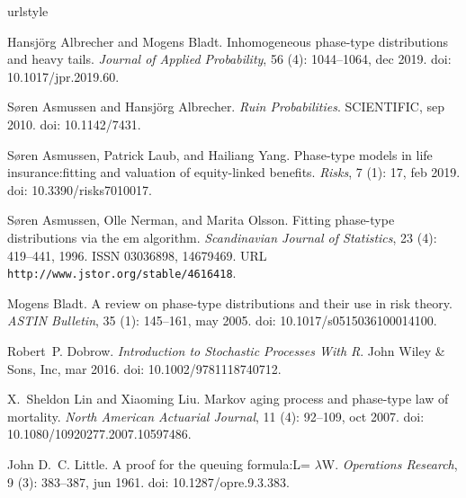 \begin{thebibliography}{11}
\providecommand{\natexlab}[1]{#1}
\providecommand{\url}[1]{\texttt{#1}}
\expandafter\ifx\csname urlstyle\endcsname\relax
  \providecommand{\doi}[1]{doi: #1}\else
  \providecommand{\doi}{doi: \begingroup \urlstyle{rm}\Url}\fi

Hansjörg Albrecher and Mogens Bladt.
\newblock Inhomogeneous phase-type distributions and heavy tails.
\newblock \emph{Journal of Applied Probability}, 56 (4):
  1044--1064, dec 2019.
\newblock \doi{10.1017/jpr.2019.60}.

S{\o}ren Asmussen and Hansjörg Albrecher.
\newblock \emph{Ruin Probabilities}.
 {SCIENTIFIC}, sep 2010.
\newblock \doi{10.1142/7431}.

S{\o}ren Asmussen, Patrick Laub, and Hailiang Yang.
\newblock Phase-type models in life insurance:fitting and valuation of
  equity-linked benefits.
\newblock \emph{Risks}, 7 (1): 17, feb 2019.
\newblock \doi{10.3390/risks7010017}.

Søren Asmussen, Olle Nerman, and Marita Olsson.
\newblock Fitting phase-type distributions via the em algorithm.
\newblock \emph{Scandinavian Journal of Statistics}, 23 (4):
  419--441, 1996.
\newblock ISSN 03036898, 14679469.
\newblock URL \url{http://www.jstor.org/stable/4616418}.

Mogens Bladt.
\newblock A review on phase-type distributions and their use in risk theory.
\newblock \emph{{ASTIN} Bulletin}, 35 (1): 145--161, may
  2005.
\newblock \doi{10.1017/s0515036100014100}.

Robert~P. Dobrow.
\newblock \emph{Introduction to Stochastic Processes With R}.
\newblock John Wiley {\&} Sons, Inc, mar 2016.
\newblock \doi{10.1002/9781118740712}.

X.~Sheldon Lin and Xiaoming Liu.
\newblock Markov aging process and phase-type law of mortality.
\newblock \emph{North American Actuarial Journal}, 11 (4):
  92--109, oct 2007.
\newblock \doi{10.1080/10920277.2007.10597486}.

John D.~C. Little.
\newblock A proof for the queuing formula:{L}= $ \lambda${W}.
\newblock \emph{Operations Research}, 9 (3): 383--387, jun
  1961.
\newblock \doi{10.1287/opre.9.3.383}.


\end{thebibliography}
